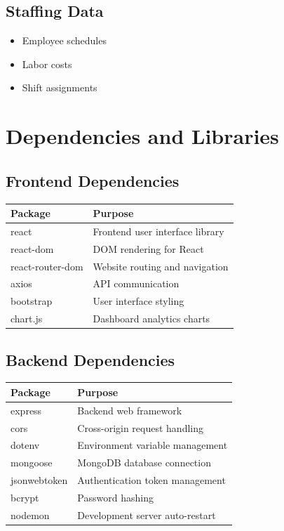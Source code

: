 \documentclass[12pt]{article}
\begin{document}
\subsection{Staffing Data}
\begin{itemize}
\item Employee schedules
\item Labor costs
\item Shift assignments
\end{itemize}

\section{Dependencies and Libraries}

\subsection{Frontend Dependencies}

\begin{longtable}{|p{5cm}|p{8cm}|}
\hline
\textbf{Package} & \textbf{Purpose} \\ \hline
react & Frontend user interface library \\ \hline
react-dom & DOM rendering for React \\ \hline
react-router-dom & Website routing and navigation \\ \hline
axios & API communication \\ \hline
bootstrap & User interface styling \\ \hline
chart.js & Dashboard analytics charts \\ \hline
\end{longtable}

\subsection{Backend Dependencies}

\begin{longtable}{|p{5cm}|p{8cm}|}
\hline
\textbf{Package} & \textbf{Purpose} \\ \hline
express & Backend web framework \\ \hline
cors & Cross-origin request handling \\ \hline
dotenv & Environment variable management \\ \hline
mongoose & MongoDB database connection \\ \hline
jsonwebtoken & Authentication token management \\ \hline
bcrypt & Password hashing \\ \hline
nodemon & Development server auto-restart \\ \hline
\end{longtable}
\end{document}
